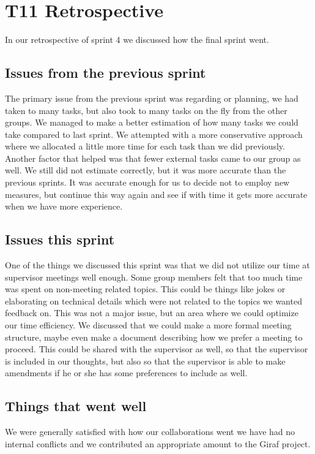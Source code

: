 \section{\gls{T11} Retrospective}

In our retrospective of sprint 4 we discussed how the final sprint went.

\subsection{Issues from the previous sprint}
The primary issue from the previous sprint was regarding or planning, we had taken to many tasks, but also took to many tasks on the fly from the other groups.
We managed to make a better estimation of how many tasks we could take compared to last sprint. We attempted with a more conservative approach where we allocated a little more time for each task than we did previously. Another factor that helped was that fewer external tasks came to our group as well. We still did not estimate correctly, but it was more accurate than the previous  sprints. It was accurate enough for us to decide not to employ new measures, but continue this way again and see if with time it gets more accurate when we have more experience.

\subsection{Issues this sprint}
One of the things we discussed this sprint was that we did not utilize our time at supervisor meetings well enough. Some group members felt that too much time was spent on non-meeting related topics. This could be things like jokes or elaborating on technical details which were not related to the topics we wanted feedback on. This was not a major issue, but an area where we could optimize our time efficiency.
We discussed that we could make a more formal meeting structure, maybe even make a document describing how we prefer a meeting to proceed. This could be shared with the supervisor as well, so that the supervisor is included in our thoughts, but also so that the supervisor is able to make amendments if he or she has some preferences to include as well.

\subsection{Things that went well}
We were generally satisfied with how our collaborations went we have had no internal conflicts and we contributed  an appropriate amount to the Giraf project. 
